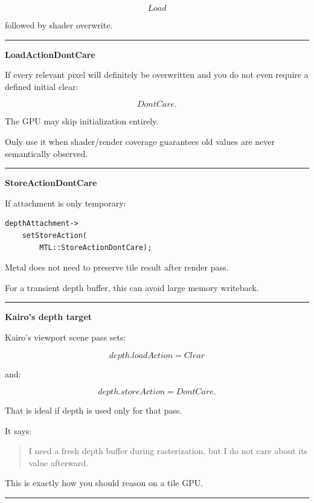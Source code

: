 \[
Load
\]

followed by shader overwrite.

\begin{center}\rule{0.5\linewidth}{0.5pt}\end{center}

\textbf{LoadActionDontCare}

If every relevant pixel will definitely be overwritten and you do not even require a defined initial clear:

\[
DontCare.
\]

The GPU may skip initialization entirely.

Only use it when shader/render coverage guarantees old values are never semantically observed.

\begin{center}\rule{0.5\linewidth}{0.5pt}\end{center}

\textbf{StoreActionDontCare}

If attachment is only temporary:

\begin{verbatim}
depthAttachment->
    setStoreAction(
        MTL::StoreActionDontCare);
\end{verbatim}

Metal does not need to preserve tile result after render pass.

For a transient depth buffer, this can avoid large memory writeback.

\begin{center}\rule{0.5\linewidth}{0.5pt}\end{center}

\textbf{Kairo's depth target}

Kairo's viewport scene pass sets:

\[
depth.loadAction=Clear
\]

and:

\[
depth.storeAction=DontCare.
\]

That is ideal if depth is used only for that pass.

It says:

\begin{quote}
I need a fresh depth buffer during rasterization, but I do not care about its value afterward.
\end{quote}

This is exactly how you should reason on a tile GPU.

\begin{center}\rule{0.5\linewidth}{0.5pt}\end{center}

